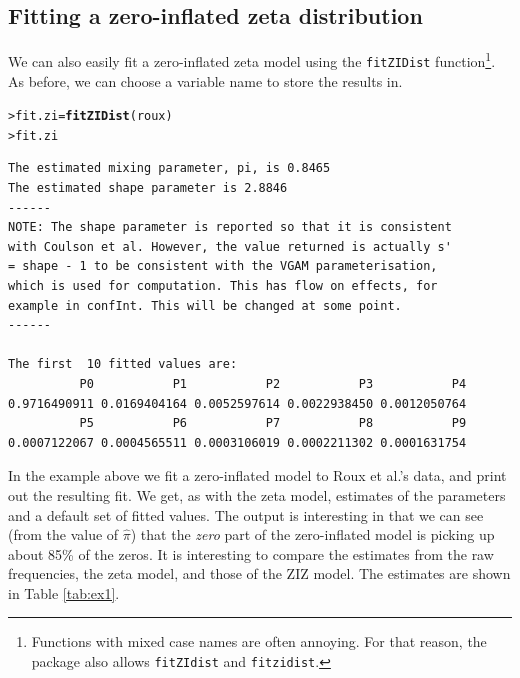 \documentclass{article}\usepackage[]{graphicx}\usepackage[]{xcolor}
\makeatletter
\newcommand{\hlstd}[1]{\textcolor[rgb]{0.345,0.345,0.345}{#1}}%
\newcommand{\hlkwb}[1]{\textcolor[rgb]{0.69,0.353,0.396}{#1}}%
\newcommand{\hlkwd}[1]{\textcolor[rgb]{0.737,0.353,0.396}{\textbf{#1}}}%
\newenvironment{kframe}{%
 \def\at@end@of@kframe{}%
 \ifinner\ifhmode%
  \def\at@end@of@kframe{\end{minipage}}%
  \begin{minipage}{\columnwidth}%
 \fi\fi%
 \def\FrameCommand##1{\hskip\@totalleftmargin \hskip-\fboxsep
 \colorbox{shadecolor}{##1}\hskip-\fboxsep
     \hskip-\linewidth \hskip-\@totalleftmargin \hskip\columnwidth}%
 \MakeFramed {\advance\hsize-\width
   \@totalleftmargin\z@ \linewidth\hsize
   \@setminipage}}%
 {\par\unskip\endMakeFramed%
 \at@end@of@kframe}
\newenvironment{knitrout}{}{} %
\newcommand{\rcode}[1]{\lstinline[language=R,basicstyle=\normalsize\ttfamily]!#1!}
\makeatother
\begin{document}
\subsection{Fitting a zero-inflated zeta distribution}
We can also easily fit a zero-inflated zeta model using the \rcode{fitZIDist} function\footnote{Functions with mixed case names are often annoying. For that reason, the package also allows \rcode{fitZIdist} and \rcode{fitzidist}.}. As before, we can choose a variable name to store the results in.
\begin{knitrout}
\color{fgcolor}\begin{kframe}
\begin{alltt}
\hlstd{> }\hlstd{fit.zi} \hlkwb{=} \hlkwd{fitZIDist}\hlstd{(roux)}
\hlstd{> }\hlstd{fit.zi}
\end{alltt}
\begin{verbatim}
The estimated mixing parameter, pi, is 0.8465 
The estimated shape parameter is 2.8846 
------
NOTE: The shape parameter is reported so that it is consistent
with Coulson et al. However, the value returned is actually s'
= shape - 1 to be consistent with the VGAM parameterisation,
which is used for computation. This has flow on effects, for
example in confInt. This will be changed at some point.
------

The first  10 fitted values are:
          P0           P1           P2           P3           P4 
0.9716490911 0.0169404164 0.0052597614 0.0022938450 0.0012050764 
          P5           P6           P7           P8           P9 
0.0007122067 0.0004565511 0.0003106019 0.0002211302 0.0001631754 
\end{verbatim}
\end{kframe}
\end{knitrout}\noindent
In the example above we fit a zero-inflated model to Roux et al.'s data, and print out the resulting fit. We get, as with the zeta model, estimates of the parameters and a default set of fitted values. The output is interesting in that we can see (from the value of $\hat{\pi}$) that the \emph{zero} part of the zero-inflated model is picking up about 85\% of the zeros. It is interesting to compare the estimates from the raw frequencies, the zeta model, and those of the ZIZ model. The estimates are shown in Table \ref{tab:ex1}.
\end{document}
